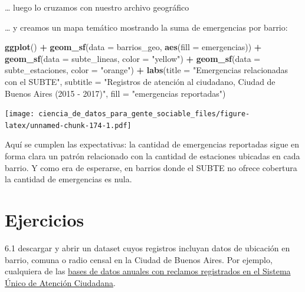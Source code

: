 \documentclass[spanish,]{book}
\newenvironment{Shaded}{\begin{snugshade}}{\end{snugshade}}
\newcommand{\DataTypeTok}[1]{\textcolor[rgb]{0.13,0.29,0.53}{#1}}
\newcommand{\KeywordTok}[1]{\textcolor[rgb]{0.13,0.29,0.53}{\textbf{#1}}}
\newcommand{\NormalTok}[1]{#1}
\newcommand{\OperatorTok}[1]{\textcolor[rgb]{0.81,0.36,0.00}{\textbf{#1}}}
\newcommand{\StringTok}[1]{\textcolor[rgb]{0.31,0.60,0.02}{#1}}
\begin{document}
\ldots{} luego lo cruzamos con nuestro archivo geográfico

\begin{Shaded}
\end{Shaded}

\ldots{} y creamos un mapa temático mostrando la suma de emergencias por barrio:

\begin{Shaded}
\begin{Highlighting}[]
\KeywordTok{ggplot}\NormalTok{() }\OperatorTok{+}
\StringTok{    }\KeywordTok{geom_sf}\NormalTok{(}\DataTypeTok{data =}\NormalTok{ barrios_geo, }\KeywordTok{aes}\NormalTok{(}\DataTypeTok{fill =}\NormalTok{ emergencias)) }\OperatorTok{+}
\StringTok{    }\KeywordTok{geom_sf}\NormalTok{(}\DataTypeTok{data =}\NormalTok{ subte_lineas, }\DataTypeTok{color =} \StringTok{"yellow"}\NormalTok{) }\OperatorTok{+}
\StringTok{    }\KeywordTok{geom_sf}\NormalTok{(}\DataTypeTok{data =}\NormalTok{ subte_estaciones, }\DataTypeTok{color =} \StringTok{"orange"}\NormalTok{) }\OperatorTok{+}
\StringTok{    }\KeywordTok{labs}\NormalTok{(}\DataTypeTok{title =} \StringTok{"Emergencias relacionadas con el SUBTE"}\NormalTok{,}
         \DataTypeTok{subtitle =} \StringTok{"Registros de atención al ciudadano, Ciudad de Buenos Aires (2015 - 2017)"}\NormalTok{,}
         \DataTypeTok{fill =} \StringTok{"emergencias reportadas"}\NormalTok{)}
\end{Highlighting}
\end{Shaded}

\texttt{[image: ciencia\_de\_datos\_para\_gente\_sociable\_files/figure-latex/unnamed-chunk-174-1.pdf]}

Aquí se cumplen las expectativas: la cantidad de emergencias reportadas sigue en forma clara un patrón relacionado con la cantidad de estaciones ubicadas en cada barrio. Y como era de esperarse, en barrios donde el SUBTE no ofrece cobertura la cantidad de emergencias es nula.

\hypertarget{ejercicios-4}{%
\section{Ejercicios}\label{ejercicios-4}}

6.1 descargar y abrir un dataset cuyos registros incluyan datos de ubicación en barrio, comuna o radio censal en la Ciudad de Buenos Aires. Por ejemplo, cualquiera de las \href{https://data.buenosaires.gob.ar/dataset/sistema-unico-atencion-ciudadana}{bases de datos anuales con reclamos registrados en el Sistema Único de Atención Ciudadana}.
\end{document}
